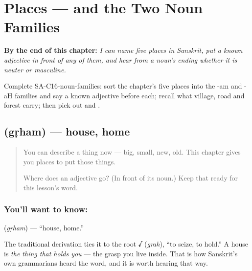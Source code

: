 
\chapter{Places --- and the Two Noun Families}
\label{ch:sa-places}

\begin{chapteropening}
\textbf{By the end of this chapter:} \emph{I can name five places in Sanskrit, put a known adjective in front of any of them, and hear from a noun's ending whether it is neuter or masculine.}

Complete SA-C16-noun-families: sort the chapter's five places into the -am and -aH families and say a known adjective before each; recall what village, road and forest carry; then pick out  and .
\end{chapteropening}

\section[\texorpdfstring{\sk{गृहम्} (gṛham)}{गृहम् (gṛham)}]{ (gṛham) — house, home}

\label{lesson:SA-C16-house}



\begin{quote}
You can describe a thing now — big, small, new, old. This chapter gives you places to put those things.

Where does an adjective go? (In front of its noun.) Keep that ready for this lesson's word.
\end{quote}

\subsection*{You'll want to know: }
\textbf{} (\emph{gṛham}) — \textquotedblleft{}house, home.\textquotedblright{}

The traditional derivation ties it to the root \textbf{√} (\emph{grah}), \textquotedblleft{}to seize, to hold.\textquotedblright{} A house is \emph{the thing that holds you} — the grasp you live inside. That is how Sanskrit's own grammarians heard the word, and it is worth hearing that way.

